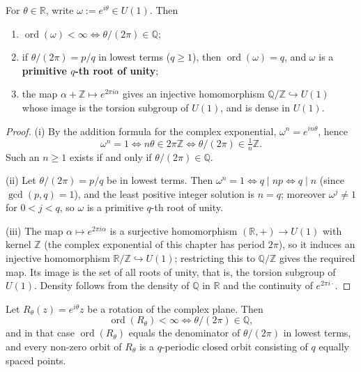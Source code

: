 \begin{proposition}\label{prop:complex_exp_finite_order}
For $\theta\in\mathbb{R}$, write $\omega:=e^{i\theta}\in U(1)$. Then
\begin{enumerate}[label=(\roman*)]
    \item $\operatorname{ord}(\omega)<\infty\iff\theta/(2\pi)\in\mathbb{Q}$;
    \item if $\theta/(2\pi)=p/q$ in lowest terms ($q\ge1$), then $\operatorname{ord}(\omega)=q$, and $\omega$ is a \textbf{primitive $q$-th root of unity};
    \item the map $\alpha+\mathbb{Z}\mapsto e^{2\pi i\alpha}$ gives an injective homomorphism $\mathbb{Q}/\mathbb{Z}\hookrightarrow U(1)$ whose image is the torsion subgroup of $U(1)$, and is dense in $U(1)$.
\end{enumerate}
\end{proposition}

\begin{proof}
(i) By the addition formula for the complex exponential, $\omega^n=e^{in\theta}$, hence
\[
\omega^n=1\iff n\theta\in2\pi\mathbb{Z}\iff \theta/(2\pi)\in\tfrac1n\mathbb{Z}.
\]
Such an $n\ge1$ exists if and only if $\theta/(2\pi)\in\mathbb{Q}$.

(ii) Let $\theta/(2\pi)=p/q$ be in lowest terms. Then $\omega^n=1\iff q\mid np\iff q\mid n$ (since $\gcd(p,q)=1$), and the least positive integer solution is $n=q$; moreover $\omega^j\neq1$ for $0<j<q$, so $\omega$ is a primitive $q$-th root of unity.

(iii) The map $\alpha\mapsto e^{2\pi i\alpha}$ is a surjective homomorphism $(\mathbb{R},+)\to U(1)$ with kernel $\mathbb{Z}$ (the complex exponential of this chapter has period $2\pi$), so it induces an injective homomorphism $\mathbb{R}/\mathbb{Z}\hookrightarrow U(1)$; restricting this to $\mathbb{Q}/\mathbb{Z}$ gives the required map. Its image is the set of all roots of unity, that is, the torsion subgroup of $U(1)$. Density follows from the density of $\mathbb{Q}$ in $\mathbb{R}$ and the continuity of $e^{2\pi i\cdot}$.
\end{proof}

\begin{corollary}\label{cor:rational_angle_finite_order}
Let $R_\theta(z)=e^{i\theta}z$ be a rotation of the complex plane. Then
\[
\operatorname{ord}(R_\theta)<\infty\iff\theta/(2\pi)\in\mathbb{Q},
\]
and in that case $\operatorname{ord}(R_\theta)$ equals the denominator of $\theta/(2\pi)$ in lowest terms, and every non-zero orbit of $R_\theta$ is a $q$-periodic closed orbit consisting of $q$ equally spaced points.
\end{corollary}

